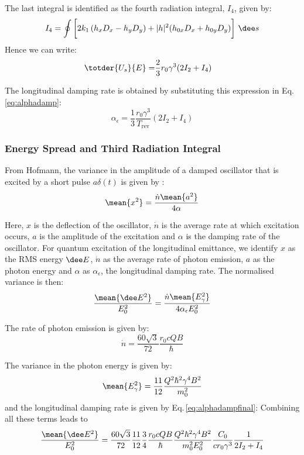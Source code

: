 The last integral is identified as the fourth radiation integral, $I_4$, given by:
\begin{equation}
    I_4 = \oint \bigg[2k_1 \left( h_x D_x - h_y D_y \right) + |h|^2 (h_{0x}D_x + h_{0y} D_y)\bigg] \ \dee s
\end{equation}
Hence we can write:
\begin{align}
    \totder{U_s}{E} = &\frac{2}{3} r_0 \gamma^3 (2I_2 + I_4 )
\end{align}

The longitudinal damping rate is obtained by substituting this expression in Eq.\,\eqref{eq:alphadamp}:
\begin{equation}
    \alpha_\epsilon =
      \frac{1}{3} \frac{r_0 \gamma^3}{T_\text{rev}} (2I_2 + I_4 )
    \label{eq:alphadampfinal}
\end{equation}


\subsubsection{Energy Spread and Third Radiation Integral}
\label{sec:enespreadandi3}

From Hofmann, the variance in the amplitude of a damped oscillator that is excited by a short pulse $a\delta(t)$ is given by \cite{hofmann_2004}:
\begin{equation}
    \mean{x^2} = \frac{\dot{n} \mean{a^2}}{4\alpha}
\end{equation}

Here, $x$ is the deflection of the oscillator, $\dot{n}$ is the average rate at which excitation occurs, $a$ is the amplitude of the excitation and $\alpha$ is the damping rate of the oscillator. For quantum excitation of the longitudinal emittance, we identify $x$ as the RMS energy $\dee E$, $\dot{n}$ as the average rate of photon emission, $a$ as the photon energy and $\alpha$ as $\alpha_\epsilon$, the longitudinal damping rate. The normalised variance is then:
\begin{equation}
    \frac{\mean{\dee E^2}}{E_0^2} = \frac{\dot{n} \mean{E_\gamma^2}}{4 \alpha_\epsilon E_0^2}
    \label{eq:notreallycampbell}
\end{equation}

The rate of photon emission is given by:
\begin{equation}
    \dot{n} = \frac{60 \sqrt{3}}{72} \frac{r_0 c Q B}{\hbar}
\end{equation}

The variance in the photon energy is given by:
\begin{equation}
    \mean{E_\gamma^2} = \frac{11}{12} \frac{Q^2\hbar^2 \gamma^4 B^2}{m_0^2}
\end{equation}
and the longitudinal damping rate is given by Eq.\,\eqref{eq:alphadampfinal}:
Combining all these terms leads to
\begin{equation}
    \frac{\mean{\dee E^2}}{E_0^2} = \frac{60 \sqrt{3}}{72} \frac{11}{12} \frac{3}{4} \frac{r_0 c Q B}{\hbar} \frac{Q^2\hbar^2 \gamma^4 B^2}{m_0^2 E_0^2} \frac{C_0}{c r_0 \gamma^3} \frac{1}{2I_2 + I_4}
\end{equation}

